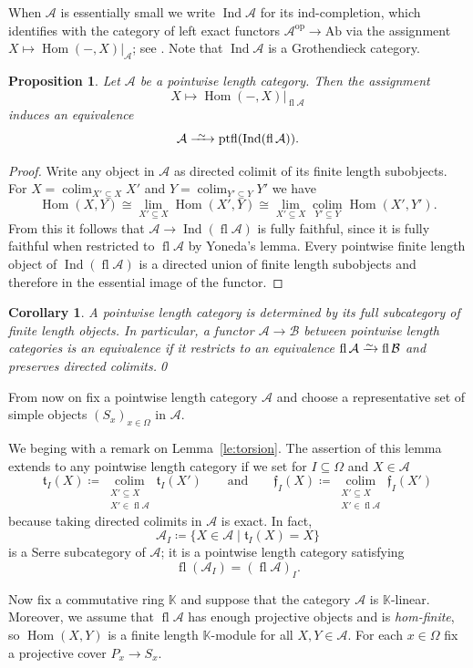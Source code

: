 \documentclass[a4paper]{amsart}
\theoremstyle{plain}
\newtheorem{prop}[thm]{Proposition}
\newtheorem{cor}[thm]{Corollary}
\theoremstyle{definition}
\theoremstyle{remark}
\numberwithin{equation}{section}
\newcommand{\colim}{\operatorname*{colim}}
\newcommand{\fl}{\operatorname{fl}}
\newcommand{\Hom}{\operatorname{Hom}}
\newcommand{\Ind}{\operatorname{Ind}}
\newcommand{\ptfl}{\operatorname{ptfl}}
\newcommand{\Ab}{\mathrm{Ab}}
\newcommand{\op}{\mathrm{op}}
\newcommand{\iso}{\xrightarrow{\raisebox{-.4ex}[0ex][0ex]{$\scriptstyle{\sim}$}}}
\newcommand{\longiso}{\xrightarrow{\ \raisebox{-.4ex}[0ex][0ex]{$\scriptstyle{\sim}$}\ }}
\def\A{\mathcal A}
\def\B{\mathcal B}
\def\bbK{\mathbb K}
\newcommand{\frf}{\mathfrak{f}}
\newcommand{\frt}{\mathfrak{t}}
\def\Om{\Omega}
\begin{document}
When $\A$ is essentially small we write $\Ind\A$ for its
ind-completion, which identifies with the category of left exact
functors $\A^\op\to\Ab$ via the assignment $X\mapsto\Hom(-,X)|_\A$;
see \cite[II]{Ga1962}. Note that $\Ind\A$ is a Grothendieck category.

\begin{prop}\label{pr:ind}
  Let $\A$ be a pointwise length category. Then the
  assignment \[X\longmapsto\Hom(-,X)|_{\fl\A}\] induces an equivalence
  \[\A\longiso  \ptfl(\Ind(\fl\A)).\]
\end{prop}
\begin{proof}
  Write any object in $\A$ as directed colimit of its finite length
  subobjects. For $X=\colim_{X'\subseteq X}X'$ and
  $Y=\colim_{Y'\subseteq Y}Y'$ we have
  \[\Hom(X,Y)\cong\lim_{X'\subseteq X}\Hom(X',Y)
    \cong\lim_{X'\subseteq X}\colim_{Y'\subseteq Y}\Hom(X',Y').\] From
  this it follows that $\A\to\Ind(\fl\A)$ is fully faithful, since it
  is fully faithful when restricted to $\fl\A$ by Yoneda's
  lemma. Every pointwise finite length object of $\Ind(\fl\A)$ is a
directed union of finite length subobjects and therefore in the essential image of the
  functor.
\end{proof}

\begin{cor}\label{co:ptfl}
A pointwise length category is determined by its
full subcategory of finite length objects. In particular, a functor
$\A\to\B$ between  pointwise length categories is an equivalence if it restricts
to an equivalence $\fl\A\iso\fl\B$ and preserves directed colimits.\qed
\end{cor}

From now on fix a pointwise length category $\A$ and choose a representative
set of simple objects $(S_x)_{x\in \Om}$ in $\A$.

We beging with a remark on Lemma~\ref{le:torsion}. The assertion of
this lemma extends to any
pointwise length category if we set for $I\subseteq \Om$ and $X\in\A$
\[\frt_I(X)\coloneqq\colim_{\substack{X'\subseteq X\\
      X'\in\fl\A}}\frt_I(X')\qquad\text{and}\qquad
  \frf_I(X)\coloneqq\colim_{\substack{X'\subseteq X\\
      X'\in\fl\A}}\frf_I(X')\] because taking directed colimits in
$\A$ is exact. In fact,
\[\A_I\coloneqq\{X\in\A\mid \frt_I(X)=X\}\]
is a Serre subcategory of $\A$; it is a pointwise length
category satisfying
\[\fl(\A_I)=(\fl\A)_I.\]

Now fix a commutative ring $\bbK$ and suppose that the category $\A$
is $\bbK$-linear. Moreover, we assume that $\fl\A$ has enough
projective objects and is \emph{hom-finite}, so $\Hom(X,Y)$ is a
finite length $\bbK$-module for all $X,Y\in\A$.  For each $x\in \Om$ fix
a projective cover $P_x\to S_x$.
\end{document}
